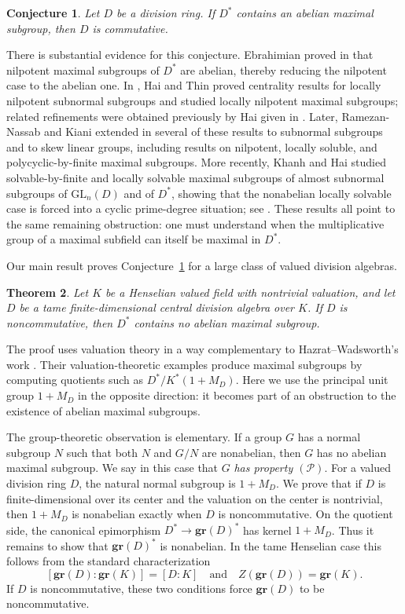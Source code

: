 \documentclass[11pt]{amsart}
\newtheorem{theorem}{Theorem}[section]
\newtheorem{conjecture}[theorem]{Conjecture}
\theoremstyle{definition}
\begin{document}
\begin{conjecture}
\label{conj:abelian-maximal}
Let $D$ be a division ring.  If $D^*$ contains an abelian maximal subgroup,
then $D$ is commutative.
\end{conjecture}

There is substantial evidence for this conjecture.  Ebrahimian proved in \cite{E} that nilpotent maximal subgroups of $D^*$ are abelian, thereby reducing the
nilpotent case to the abelian one.  In \cite{HT}, Hai and Thin proved centrality
results for locally nilpotent subnormal subgroups and studied locally
nilpotent maximal subgroups; related refinements were obtained previously by
Hai given in \cite{Hai}.  Later, Ramezan-Nassab and Kiani extended in \cite{RK1,RK2,RK3} several of these results to subnormal subgroups and to skew linear groups, including results on nilpotent, locally soluble, and polycyclic-by-finite maximal subgroups.  More recently, Khanh and Hai studied solvable-by-finite
and locally solvable maximal subgroups of almost subnormal subgroups of
$\mathrm{GL}_n(D)$ and of $D^*$, showing that the nonabelian locally solvable case is
forced into a cyclic prime-degree situation; see \cite{KH1,KH2}.  These results
all point to the same remaining obstruction: one must understand when the
multiplicative group of a maximal subfield can itself be maximal in $D^*$.

Our main result proves Conjecture~\ref{conj:abelian-maximal} for a large
class of valued division algebras.

\begin{theorem}
\label{thm:intro-main}
Let $K$ be a Henselian valued field with nontrivial valuation, and let $D$ be
a tame finite-dimensional central division algebra over $K$.  If $D$ is
noncommutative, then $D^*$ contains no abelian maximal subgroup.
\end{theorem}

The proof uses valuation theory in a way complementary to Hazrat--Wadsworth's
work \cite{HaW1}.  Their valuation-theoretic examples produce maximal subgroups by
computing quotients such as $D^*/K^*(1+M_D)$.  Here we use the principal unit
group $1+M_D$ in the opposite direction: it becomes part of an obstruction to
the existence of abelian maximal subgroups.

The group-theoretic observation is elementary.  If a group $G$ has a normal
subgroup $N$ such that both $N$ and $G/N$ are nonabelian, then $G$ has no
abelian maximal subgroup.  We say in this case that $G$ \textit{has property
$(\mathcal P)$}.  For a valued division ring $D$, the natural normal subgroup
is $1+M_D$.  We prove that if $D$ is finite-dimensional over its center and
the valuation on the center is nontrivial, then $1+M_D$ is nonabelian exactly
when $D$ is noncommutative.  On the quotient side, the canonical epimorphism
$D^*\to \mathbf{gr}(D)^*$ has kernel $1+M_D$.  Thus it remains to show that
$\mathbf{gr}(D)^*$ is nonabelian.  In the tame Henselian case this follows
from the standard characterization
\[
        [\mathbf{gr}(D):\mathbf{gr}(K)]=[D:K]
        \quad\text{and}\quad
        Z(\mathbf{gr}(D))=\mathbf{gr}(K).
\]
If $D$ is noncommutative, these two conditions force $\mathbf{gr}(D)$ to be
noncommutative.
\end{document}
